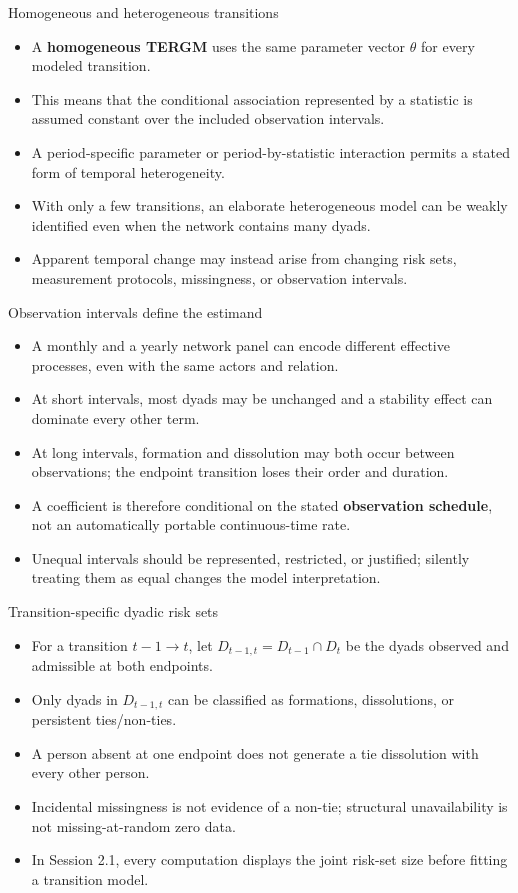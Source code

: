 \documentclass[aspectratio=169,11pt]{beamer}
\newcommand{\term}[1]{\textbf{\color{nupurple}#1}}
\begin{document}
\begin{frame}{Homogeneous and heterogeneous transitions}
\begin{itemize}
\item A \term{homogeneous TERGM} uses the same parameter vector $\theta$ for every modeled transition.
\item This means that the conditional association represented by a statistic is assumed constant over the included observation intervals.
\item A period-specific parameter or period-by-statistic interaction permits a stated form of temporal heterogeneity.
\item With only a few transitions, an elaborate heterogeneous model can be weakly identified even when the network contains many dyads.
\item Apparent temporal change may instead arise from changing risk sets, measurement protocols, missingness, or observation intervals.
\end{itemize}
\end{frame}

\begin{frame}{Observation intervals define the estimand}
\begin{itemize}
\item A monthly and a yearly network panel can encode different effective processes, even with the same actors and relation.
\item At short intervals, most dyads may be unchanged and a stability effect can dominate every other term.
\item At long intervals, formation and dissolution may both occur between observations; the endpoint transition loses their order and duration.
\item A coefficient is therefore conditional on the stated \term{observation schedule}, not an automatically portable continuous-time rate.
\item Unequal intervals should be represented, restricted, or justified; silently treating them as equal changes the model interpretation.
\end{itemize}
\end{frame}

\begin{frame}{Transition-specific dyadic risk sets}
\begin{itemize}
\item For a transition $t-1\to t$, let $D_{t-1,t}=D_{t-1}\cap D_t$ be the dyads observed and admissible at both endpoints.
\item Only dyads in $D_{t-1,t}$ can be classified as formations, dissolutions, or persistent ties/non-ties.
\item A person absent at one endpoint does not generate a tie dissolution with every other person.
\item Incidental missingness is not evidence of a non-tie; structural unavailability is not missing-at-random zero data.
\item In Session 2.1, every computation displays the joint risk-set size before fitting a transition model.
\end{itemize}
\end{frame}
\end{document}

